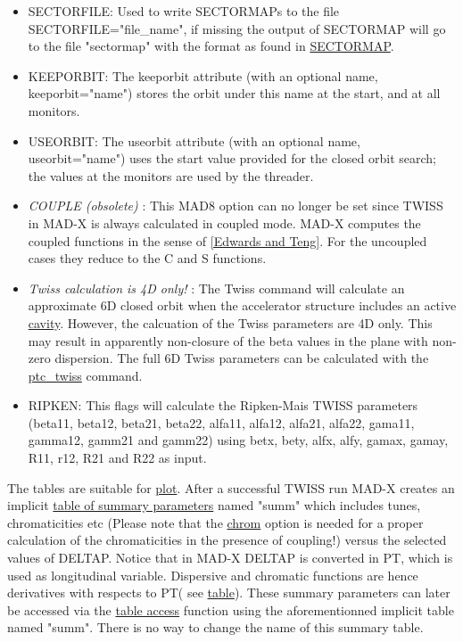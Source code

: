 \begin{itemize}
	\item SECTORFILE: Used to write SECTORMAPs to the file SECTORFILE="file\_name", if missing the output of SECTORMAP will go to the file "sectormap" with the format as found in \href{../Introduction/sectormap.html}{SECTORMAP}.   
	\item KEEPORBIT: The keeporbit attribute (with an optional name, keeporbit="name") stores the orbit under this name at the start, and at all monitors.   
	\item USEORBIT: The useorbit attribute (with an optional name, useorbit="name") uses the start value provided for the closed orbit search; the values at the monitors are used by the threader.   
	\item \textit{ COUPLE (obsolete)} : This MAD8 option can no longer be set since TWISS in MAD-X is always calculated in coupled mode. MAD-X computes the coupled functions in the sense of \href{../Introduction/bibliography.html#edwards}{[Edwards and Teng]}. For the uncoupled cases they reduce to the C and S functions.   
	\item \textit{ Twiss calculation is 4D only!} : The Twiss command will calculate an approximate 6D closed orbit when the accelerator structure includes an active \href{../Introduction/cavity.html}{cavity}. However, the calcuation of the Twiss parameters are 4D only. This may result in apparently non-closure of the beta values in the plane with non-zero dispersion. The full 6D Twiss parameters can be calculated with the \href{../ptc_twiss/ptc_twiss.html}{ptc\_twiss} command.   
	\item RIPKEN: This flags will calculate the Ripken-Mais TWISS parameters (beta11, beta12, beta21, beta22, alfa11, alfa12, alfa21, alfa22, gama11, gamma12, gamm21 and gamm22) using betx, bety, alfx, alfy, gamax, gamay, R11, r12, R21 and R22 as input. 
\end{itemize}
 The tables are suitable for \href{../plot/plot.html}{plot}.   After a successful TWISS run MAD-X creates an implicit \href{../Introduction/tables.html#summ}{table of summary parameters} named "summ" which includes tunes, chromaticities etc (Please note that the \href{../Introduction/tables.html#chrom}{chrom} option is needed  for a proper calculation of the chromaticities in the presence of coupling!) versus the selected values of DELTAP. Notice that in MAD-X DELTAP is converted in PT, which is used as longitudinal variable. Dispersive and chromatic functions are hence derivatives with respects to PT( see \href{../Introduction/tables.html#summ}{table}). These summary parameters can later be accessed via the \href{../Introduction/expression.html#table}{table access} function using the aforementionned implicit table named "summ". There is no way to change the name of this summary table. 

